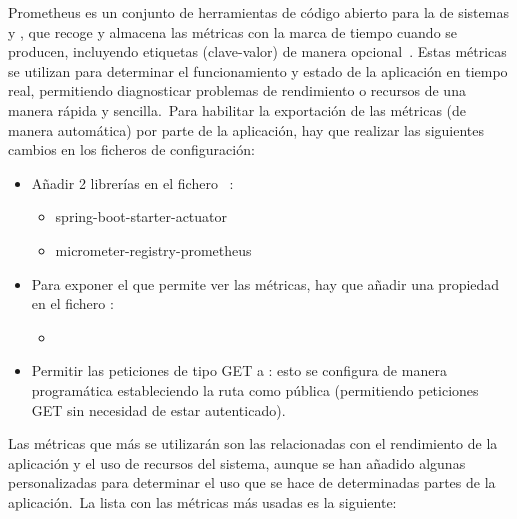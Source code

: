 Prometheus es un conjunto de herramientas de código abierto para la  de sistemas y
, que recoge y
almacena las métricas con la marca de tiempo cuando se producen, incluyendo etiquetas (clave-valor) de manera
opcional~\cite{prometheus-overview}.
Estas métricas se utilizan para determinar el funcionamiento y estado de la aplicación en tiempo real, permitiendo
diagnosticar problemas de rendimiento o recursos de una manera rápida y sencilla.\ Para habilitar la exportación de
las métricas (de manera automática) por parte de la aplicación, hay que realizar las siguientes cambios en los
ficheros de configuración:

\begin{itemize}
	\item Añadir 2 librerías en el fichero ~\cite{prometheus-metrics-pom}:
	\begin{itemize}
		\item spring-boot-starter-actuator
		\item micrometer-registry-prometheus
	\end{itemize}

	\item Para exponer el  que permite ver las métricas, hay que añadir una propiedad en el fichero
	:
	\begin{itemize}
		\item {}
	\end{itemize}

	\item Permitir las peticiones de tipo GET a : esto se configura
	de manera programática estableciendo la ruta como pública (permitiendo peticiones GET sin necesidad de estar
	autenticado).
\end{itemize}
\label{itm:metrics-export-config}

Las métricas que más se utilizarán son las relacionadas con el rendimiento de la aplicación y el uso de recursos del
sistema, aunque se han añadido algunas personalizadas para determinar el uso que se hace de determinadas partes de la
aplicación.\ La lista con las métricas más usadas es la siguiente:

